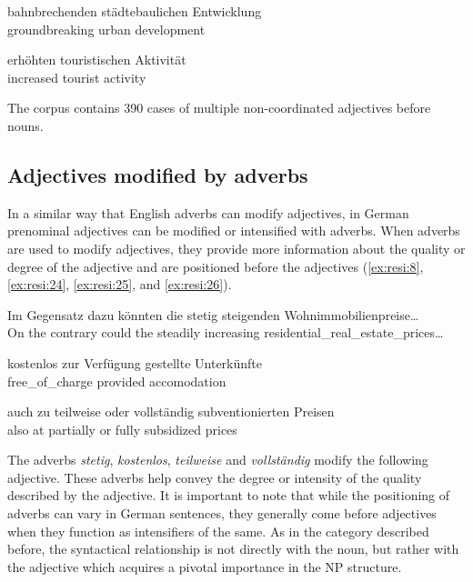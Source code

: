 \documentclass[output=paper,colorlinks,citecolor=brown]{langscibook}
\begin{document}
\begin{exe}
\gll bahnbrechenden  städtebaulichen  Entwicklung\\
  groundbreaking  urban  development\\
\end{exe}

\begin{exe}
\gll erhöhten  touristischen  Aktivität\\
  increased  tourist  activity\\
\end{exe}

The corpus contains 390 cases of multiple non-coordinated adjectives before nouns.

\subsection{Adjectives modified by adverbs}\label{sec:4.4}

In a similar way that English adverbs can modify adjectives, in German prenominal adjectives can be modified or intensified with adverbs. When adverbs are used to modify adjectives, they provide more information about the quality or degree of the adjective and are positioned before the adjectives (\ref{ex:resi:8}, \ref{ex:resi:24}, \ref{ex:resi:25}, and \ref{ex:resi:26}).

\ea%
    \label{ex:resi:24}
\gll Im Gegensatz dazu  könnten  die  stetig  steigenden  Wohnimmobilienpreise… \\
    On the contrary     could  the  steadily  increasing  residential\_real\_estate\_prices… \\
\z





\ea%
    \label{ex:resi:25}
\gll kostenlos       {zur Verfügung gestellte}  Unterkünfte \\
     free\_of\_charge  provided  accomodation    \\
\z




\ea%
    \label{ex:resi:26}
\gll auch  zu  teilweise  oder  vollständig  subventionierten  Preisen \\
     also  at  partially  or  fully  subsidized  prices  \\
\z



The adverbs \textit{stetig}, \textit{kostenlos}, \textit{teilweise} and \textit{vollständig} modify the following adjective. These adverbs help convey the degree or intensity of the quality described by the adjective. It is important to note that while the positioning of adverbs can vary in German sentences, they generally come before adjectives when they function as intensifiers of the same. As in the category described before, the syntactical relationship is not directly with the noun, but rather with the adjective which acquires a pivotal importance in the NP structure.
\end{document}
